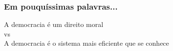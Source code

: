 \documentclass[xcolor=dvipsnames]{beamer}
\newcommand{\byellow}[1]{\colorbox{yellow}{#1}}
\newcommand{\bgreen}[1]{\colorbox{green}{#1}}
\begin{document}
\begin{frame}
	\frametitle{Em pouquíssimas palavras...}
	
\begin{center}
\huge{A democracia é um direito moral} \\[0.2cm]
\large{vs}\\[0.2cm]
\huge{A democracia é o sistema mais eficiente que se conhece}
\end{center}

\end{frame}




\end{document}
